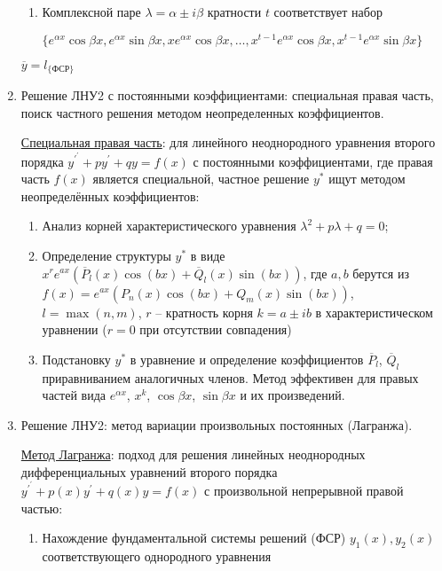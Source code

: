 \documentclass[12pt]{article}
\begin{document}
\begin{enumerate}
\begin{enumerate}
            \item Комплексной паре $\lambda = \alpha \pm i\beta$ кратности $t$ соответствует набор 
            
            $\{e^{\alpha x} \cos \beta x, e^{\alpha x} \sin \beta x, x e^{\alpha x} \cos \beta x, \dots, x^{t - 1}e^{\alpha x} \cos\beta x, x^{t - 1}e^{\alpha x} \sin\beta x\}$
        \end{enumerate}

        $\overline{y} = l_{\{\text{ФСР}\}}$

        \item Решение ЛНУ2 с постоянными коэффициентами: специальная правая часть, поиск частного решения методом неопределенных коэффициентов.

        \hyperlink{specialrightpart}{Специальная правая часть}: для линейного неоднородного уравнения второго порядка $y^\prime^\prime + py^\prime + qy = f(x)$ с постоянными коэффициентами, где правая часть $f(x)$ является специальной, частное решение $y^*$ ищут методом неопределённых коэффициентов: 
        
        \begin{enumerate}
            \item Анализ корней характеристического уравнения $\lambda^2 + p\lambda + q = 0$;
            \item Определение структуры $y^*$ в виде $x^r e^{ax} (\overline{P}_l(x) \cos(bx) + \overline{Q}_l(x) \sin(bx))$, где
            $a, b$ берутся из $f(x) = e^{ax}(P_n(x)\cos(bx) + Q_m(x)\sin(bx))$,
            $l = \max(n, m)$,
            $r$ -- кратность корня $k = a \pm ib$ в характеристическом уравнении ($r = 0$ при отсутствии совпадения)
            \item Подстановку $y^*$ в уравнение и определение коэффициентов $\overline{P}_l$, $\overline{Q}_l$ приравниванием аналогичных членов. Метод эффективен для правых частей вида $e^{\alpha x}$, $x^k$, $\cos \beta x$, $\sin \beta x$ и их произведений.
        \end{enumerate}


        \item Решение ЛНУ2: метод вариации произвольных постоянных (Лагранжа).

        \hyperlink{methodLagrangesecondorder}{Метод Лагранжа}: подход для решения линейных неоднородных дифференциальных уравнений второго порядка $y^\prime^\prime + p(x)y^\prime + q(x)y = f(x)$ с произвольной непрерывной правой частью:
        \begin{enumerate} 
            \item Нахождение фундаментальной системы решений (ФСР) $y_1(x), y_2(x)$ соответствующего однородного уравнения


\end{enumerate}
\end{enumerate}
\end{document}
